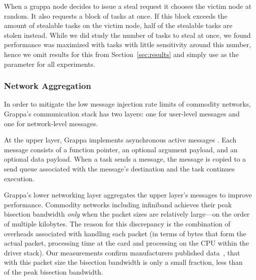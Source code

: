 When a grappa node decides to issue a steal request it chooses the
victim node at random.  It also requests a block of tasks at once.  If
this block exceeds the amount of stealable tasks on the victim node,
half of the stealable tasks are stolen instead.  While we did study the
number of tasks to steal at once, we found performance was maximized
with  tasks with little sensitivity around this number,
hence we omit results for this from Section~\ref{sec:results} and simply
use  as the parameter for all experiments.



\subsubsection{Network Aggregation}

In order to mitigate the low message injection rate limits of commodity
networks, Grappa's communication stack has two layers: one for
user-level messages and one for network-level messages. 

At the upper layer, Grappa implements asynchronous active messages
\cite{vonEicken92}. Each message consists of a function pointer, an
optional argument payload, and an optional data payload. When a task
sends a message, the message is copied to a send queue associated with
the message's destination and the task continues execution.

Grappa's lower networking layer aggregates the upper layer's messages
to improve performance. Commodity networks including infiniband
achieves their peak bisection bandwidth \emph{only} when the packet
sizes are relatively large---on the order of multiple kilobytes. The
reason for this discrepancy is the combination of overheads associated
with handling each packet (in terms of bytes that form the actual
packet, processing time at the card and processing on the
CPU within the driver stack). Our measurements confirm manufacturers
published data~\cite{infinibandbandwidth}, that with this packet size
the bisection bandwidth is only a small fraction, less than
~ of the peak bisection bandwidth.


